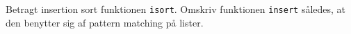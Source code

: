 Betragt insertion sort funktionen \lstinline{isort}. Omskriv
funktionen \lstinline{insert} således, at den benytter sig af pattern
matching på lister.
